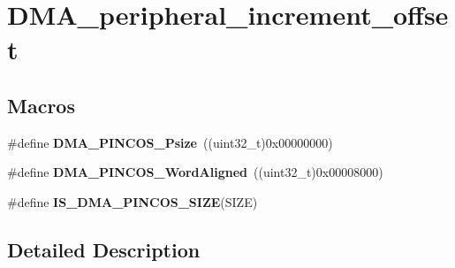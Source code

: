 \hypertarget{group___d_m_a__peripheral__increment__offset}{\section{D\-M\-A\-\_\-peripheral\-\_\-increment\-\_\-offset}
\label{group___d_m_a__peripheral__increment__offset}
}
\subsection*{Macros}
\begin{DoxyCompactItemize}
\item 
\hypertarget{group___d_m_a__peripheral__increment__offset_ga939053c42e486b82963b8eecc809bce0}{\#define {\bfseries D\-M\-A\-\_\-\-P\-I\-N\-C\-O\-S\-\_\-\-Psize}~((uint32\-\_\-t)0x00000000)}\label{group___d_m_a__peripheral__increment__offset_ga939053c42e486b82963b8eecc809bce0}

\item 
\hypertarget{group___d_m_a__peripheral__increment__offset_gaae8184971db13b62cd9f4dc5aecf9c22}{\#define {\bfseries D\-M\-A\-\_\-\-P\-I\-N\-C\-O\-S\-\_\-\-Word\-Aligned}~((uint32\-\_\-t)0x00008000)}\label{group___d_m_a__peripheral__increment__offset_gaae8184971db13b62cd9f4dc5aecf9c22}

\item 
\#define {\bfseries I\-S\-\_\-\-D\-M\-A\-\_\-\-P\-I\-N\-C\-O\-S\-\_\-\-S\-I\-Z\-E}(S\-I\-Z\-E)
\end{DoxyCompactItemize}


\subsection{Detailed Description}


